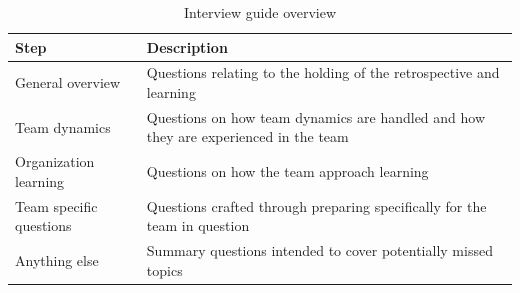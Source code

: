 \begin{table}
	\begin{centering}
	\caption{Interview guide overview}
	\begin{tabular}{l p{}}
	 	Step & Description \\ 
		\hline
		General overview & Questions relating to the holding of the retrospective and learning\\
		Team dynamics & Questions on how team dynamics are handled and how they are experienced in the team \\
		Organization learning & Questions on how the team approach learning \\
		Team specific questions & Questions crafted through preparing specifically for the team in question \\
		Anything else & Summary questions intended to cover potentially missed topics \\
	\end{tabular}
	\end{centering}
\end{table}


